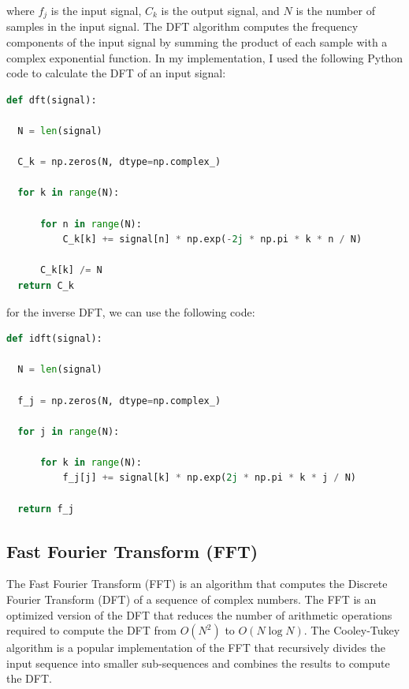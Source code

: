 \documentclass[a4paper,12pt,fleqn]{article}
\begin{document}
  where $f_j$ is the input signal, $C_k$ is the output signal, and $N$ is the number of samples in the input signal. The DFT algorithm computes the frequency components of the input signal by summing the product of each sample with a complex exponential function.
  In my implementation, I used the following Python code to calculate the DFT of an input signal:

\begin{lstlisting}[language=Python]
def dft(signal):
  
  N = len(signal)
  
  C_k = np.zeros(N, dtype=np.complex_)
  
  for k in range(N):
      
      for n in range(N):
          C_k[k] += signal[n] * np.exp(-2j * np.pi * k * n / N)
      
      C_k[k] /= N
  return C_k
\end{lstlisting}

\newpage
for the inverse DFT, we can use the following code:
\begin{lstlisting}[language=Python]
def idft(signal):
  
  N = len(signal)
  
  f_j = np.zeros(N, dtype=np.complex_)
  
  for j in range(N):
      
      for k in range(N):
          f_j[j] += signal[k] * np.exp(2j * np.pi * k * j / N)
      
  return f_j
\end{lstlisting}

\subsection{Fast Fourier Transform (FFT)}

\hspace{1 em}The Fast Fourier Transform (FFT) is an algorithm that computes the Discrete Fourier Transform (DFT) of a sequence of complex numbers. The FFT is an optimized version of the DFT that reduces the number of arithmetic operations required to compute the DFT from $O(N^2)$ to $O(N \log N)$. The Cooley-Tukey algorithm is a popular implementation of the FFT that recursively divides the input sequence into smaller sub-sequences and combines the results to compute the DFT.
\end{document}
